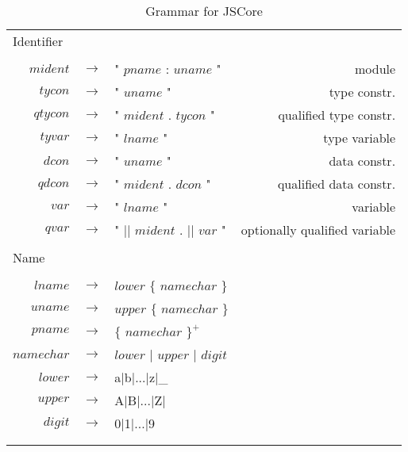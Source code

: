\begin{scriptsize}
\begin{longtable}{ r c l r }
\multicolumn{4}{l}{Identifier}			 \\
\\[0.01in]
$mident$	& $ \rightarrow $	& " $pname$ : $uname$ "												& module		\\
$tycon$		& $ \rightarrow $	& " $uname$ "													& type constr.		\\
$qtycon$	& $ \rightarrow $	& " $mident$ . $tycon$ "											& qualified type constr.\\
$tyvar$		& $ \rightarrow $	& " $lname$ "													& type variable		\\
$dcon$		& $ \rightarrow $	& " $uname$ "													& data constr.		\\
$qdcon$		& $ \rightarrow $	& " $mident$ . $dcon$ "												& qualified data constr.\\
$var$		& $ \rightarrow $	& " $lname$ "													& variable		\\
$qvar$		& $ \rightarrow $	& " $||$ $mident$ . $||$ $var$ "										& optionally qualified variable\\
\\[0.01in]

\multicolumn{4}{l}{Name}			 \\
\\[0.01in]
$lname$		& $ \rightarrow $	& $lower$ $\{$ $namechar$ $\}$								& \\
$uname$		& $ \rightarrow $	& $upper$ $\{$ $namechar$ $\}$								& \\
$pname$		& $ \rightarrow $	& $\{$ $namechar$ $\}^{+}$								& \\
$namechar$	& $ \rightarrow $	& $lower$ $|$ $upper$ $|$ $digit$							& \\
$lower$		& $ \rightarrow $	& a$|$b$|$...$|$z$|$\_									& \\
$upper$		& $ \rightarrow $	& A$|$B$|$...$|$Z$|$									& \\
$digit$		& $ \rightarrow $	& 0$|$1$|$...$|$9									& \\
\\[0.01in]

\caption{Grammar for JSCore}
\label{jscore}

\end{longtable}
\end{scriptsize}


